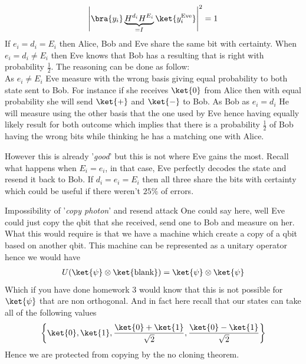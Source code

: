 \begin{align*} 
	\left|\bra{y_i}\underbrace{H^{d_i}H^{E_i}}_{= I}\ket{y_i^{\text{Eve}}}\right|^2 = 1
\end{align*}
If $e_i = d_i = E_i$ then Alice, Bob and Eve share the same bit with certainty. When $e_i = d_i \neq E_i$ then Eve knows that Bob has a resulting that is right with probability $\frac{1}{2}$. The reasoning can be done as follow:\\
As $e_i \neq E_i$ Eve measure with the wrong basis giving equal probability to both state sent to Bob. For instance if she receives $\ket{0}$ from Alice then with equal probability she will send $\ket{+}$ and $\ket{-}$ to Bob. As Bob as $e_i = d_i$ He will measure using the other basis that the one used by Eve hence having equally likely result for both outcome which implies that there is a probability $\frac{1}{2}$ of Bob having the wrong bits while thinking he has a matching one with Alice.
    

However this is already '\textit{good}' but this is not where Eve gains the most.  Recall what happens when $E_i = e_i$, in that case, Eve perfectly decodes the state and resend it back to Bob. If $d_i = e_i = E_i$ then all three share the bits with certainty which could be useful if there weren't $25 \%$ of errors.


\begin{parag}{Impossibility of '\textit{copy photon}' and resend attack}
    One could say here, well Eve could just  copy the qbit that she received, send one to Bob and measure on her. What this would require is that we have a machine which create a copy of a qbit based on another qbit. This machine can be represented as a unitary operator hence we would have
	\begin{align*} 
		U\left(\ket{\psi} \otimes \ket{\text{blank}}\right)  = \ket{\psi} \otimes \ket{\psi}
	\end{align*}
	Which if you have done homework 3 would know that this is not possible for $\ket{\psi}$ that are non orthogonal. And in fact here recall that our states can take all of the following values 
	\begin{align*} 
		\left\{\ket{0}, \ket{1}, \frac{\ket{0} + \ket{1}}{\sqrt{2}}, \frac{\ket{0} - \ket{1}}{\sqrt{2}}\right\} 
	\end{align*}
	Hence we are protected from copying by the no cloning theorem.
\end{parag}











 
